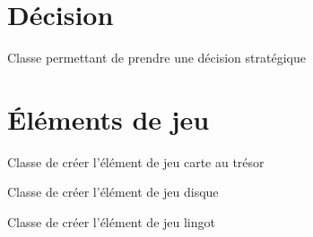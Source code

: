\documentclass[letterpaper,10pt,french]{sphinxmanual}
\begin{document}
\chapter{Décision}
\label{decision:module-lib.decision}\label{decision:decision}\label{decision::doc}

\begin{fulllineitems}
\label{decision:lib.decision.Decision}
Classe permettant de prendre une décision stratégique

\end{fulllineitems}



\chapter{Éléments de jeu}
\label{elements_jeu:elements-de-jeu}\label{elements_jeu::doc}\label{elements_jeu:module-lib.elements_jeu}

\begin{fulllineitems}
\label{elements_jeu:lib.elements_jeu.Carte_tresor}
Classe de créer l'élément de jeu carte au trésor

\end{fulllineitems}


\begin{fulllineitems}
\label{elements_jeu:lib.elements_jeu.Disque}
Classe de créer l'élément de jeu disque

\end{fulllineitems}


\begin{fulllineitems}
\label{elements_jeu:lib.elements_jeu.Lingot}
Classe de créer l'élément de jeu lingot

\end{fulllineitems}

\end{document}

